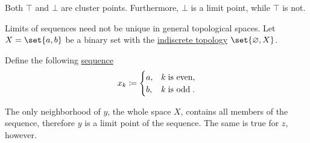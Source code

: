 \begin{example}
\begin{thmenum}
    Both \( \top \) and \( \bot \) are cluster points. Furthermore, \( \bot \) is a limit point, while \( \top \) is not.

     Limits of sequences need not be unique in general topological spaces. Let \( X = \set{ a, b } \) be a binary set with the \hyperref[def:indiscrete_topology]{indiscrete topology} \( \set{ \varnothing, X } \).

    Define the following \hyperref[def:sequence]{sequence}
    \begin{equation*}
      x_k \coloneqq \begin{cases}
        a, &k \T{is even}, \\
        b, &k \T{is odd}.
      \end{cases}
    \end{equation*}

    The only neighborhood of \( y \), the whole space \( X \), contains all members of the sequence, therefore \( y \) is a limit point of the sequence. The same is true for \( z \), however.
  \end{thmenum}
\end{example}

